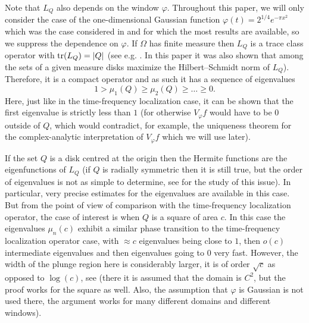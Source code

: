 \documentclass[12pt]{amsart}
\numberwithin{equation}{section}
\renewcommand{\phi}{\varphi}
\begin{document}
Note that $L_Q$ also depends on the window $\phi$. Throughout this paper, we will only consider the case of the one-dimensional Gaussian function $\phi(t) = 2^{1/4}e^{-\pi x^2}$ which was the case considered in \cite{Dau} and for which the most results are available, so we suppress the dependence on $\phi$. If $\Omega$ has finite measure then $L_Q$ is a trace class operator with ${\rm tr}(L_Q) = |Q|$ (see e.g. \cite[Proposition 3.1]{Ric}. In this paper it was also shown that among the sets of a given measure disks maximize the Hilbert--Schmidt norm of $L_Q$). Therefore, it is a compact operator and as such it has a sequence of eigenvalues
$$1 > \mu_1(Q) \ge \mu_2(Q) \ge \ldots \ge 0.$$
Here, just like in the time-frequency localization case, it can be shown that the first eigenvalue is strictly less than $1$ (for otherwise $V_\phi f$ would have to be $0$ outside of $Q$, which would contradict, for example, the uniqueness theorem for the complex-analytic interpretation of $V_\phi f$ which we will use later).

If the set $Q$ is a disk centred at the origin then the Hermite functions are the eigenfunctions of $L_Q$ (if $Q$ is radially symmetric then it is still true, but the order of eigenvalues is not as simple to determine, see \cite{Simon} for the study of this issue). In particular, very precise estimates for the eigenvalues are available in this case. But from the point of view of comparison with the time-frequency localization operator, the case of interest is when $Q$ is a square of area $c$. In this case the eigenvalues $\mu_n(c)$ exhibit a similar phase transition to the time-frequency localization operator case, with $\approx c$ eigenvalues being close to $1$, then $o(c)$ intermediate eigenvalues and then eigenvalues going to $0$ very fast. However, the width of the plunge region here is considerably larger, it is of order $\sqrt{c}$ as opposed to $\log(c)$, see \cite{Old} (there it is assumed that the domain is $C^2$, but the proof works for the square as well. Also, the assumption that $\phi$ is Gaussian is not used there, the argument works for many different domains and different windows).
\end{document}
